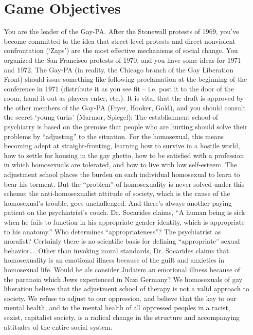 \section{Game Objectives}
\label{gameobjectives}

You are the leader of the Gay-PA. After the Stonewall protests of 1969, you've become committed to the idea that street-level protests and direct nonviolent confrontation (`Zaps') are the most effective mechanisms of social change. You organized the San Francisco protests of 1970, and you have some ideas for 1971 and 1972.
The Gay-PA (in reality, the Chicago branch of the Gay Liberation Front) should issue something like following proclamation at the beginning of the conference in 1971 (distribute it as you see fit – i.e. post it to the door of the room, hand it out as players enter, etc.). It is vital that the draft is approved by the other members of the Gay-PA (Fryer, Hooker, Gold), and you should consult the secret `young turks' (Marmor, Spiegel):
The establishment school of psychiatry is based on the premise that people who are hurting should solve their problems by “adjusting” to the situation. For the homosexual, this means becoming adept at straight-fronting, learning how to survive in a hostile world, how to settle for housing in the gay ghetto, how to be satisfied with a profession in which homosexuals are tolerated, and how to live with low self-esteem.
The adjustment school places the burden on each individual homosexual to learn to bear his torment. But the “problem” of homosexuality is never solved under this scheme; the anti-homosexualist attitude of society, which is the cause of the homosexual's trouble, goes unchallenged. And there's always another paying patient on the psychiatrist's couch.
Dr. Socarides claims, “A human being is sick when he fails to function in his appropriate gender identity, which is appropriate to his anatomy.” Who determines “appropriateness”? The psychiatrist as moralist? Certainly there is no scientific basis for defining “appropriate” sexual behavior{\ldots}. Other than invoking moral standards, Dr. Socarides claims that homosexuality is an emotional illness because of the guilt and anxieties in homosexual life. Would he als consider Judaism an emotional illness because of the paranoia which Jews experienced in Nazi Germany?
We homosexuals of gay liberation believe that the adjustment school of therapy is not a valid approach to society.
We refuse to adjust to our oppression, and believe that the key to our mental health, and to the mental health of all oppressed peoples in a racist, sexist, capitalist society, is a radical change in the structure and accompanying attitudes of the entire social system.
